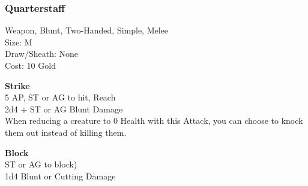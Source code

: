 \subsubsection{Quarterstaff}\label{weapon:quarterstaff}
Weapon, Blunt, Two-Handed, Simple, Melee\\
Size: M\\
Draw/Sheath: None\\
Cost: 10 Gold

\textbf{Strike}\\
5 AP, ST or AG to hit,  Reach\\
2d4 + \texttimes ST or AG Blunt Damage\\
When reducing a creature to 0 Health with this Attack, you can choose to knock them out instead of killing them.

\textbf{Block}\\
ST or AG to block)\\
1d4 Blunt or Cutting Damage

